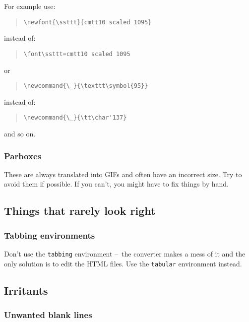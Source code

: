 \documentclass[twoside,11pt]{article}
\newcommand{\xlabel}[1]{}
\renewcommand{\_}{\texttt{\symbol{95}}}
\newcommand{\dash}{--}
\newcommand{\dash}{-}
\begin{document}
For example use:
\begin{quote}
\begin{verbatim}
\newfont{\ssttt}{cmtt10 scaled 1095}
\end{verbatim}
\end{quote}
instead of:
\begin{quote}
\begin{verbatim}
\font\ssttt=cmtt10 scaled 1095
\end{verbatim}
\end{quote}
or
\begin{quote}
\begin{verbatim}
\newcommand{\_}{\texttt\symbol{95}}
\end{verbatim}
\end{quote}
instead of:
\begin{quote}
\begin{verbatim}
\newcommand{\_}{\tt\char'137}
\end{verbatim}
\end{quote}
and so on.

\subsubsection{Parboxes}

These are always translated into GIFs and often have an incorrect
size.
Try to avoid them if possible.
If you can't, you might have to fix things by hand.

\subsection{\xlabel{things_that_rarely_look_right}Things that rarely look right}

\subsubsection{Tabbing environments}

Don't use the \verb#tabbing# environment \dash\ the converter makes a
mess of it and the only solution is to edit the HTML files.
Use the \verb#tabular# environment instead.

\subsection{\xlabel{irritants}Irritants}

\subsubsection{\xlabel{suppressing_blank_lines}Unwanted blank lines}
\end{document}
